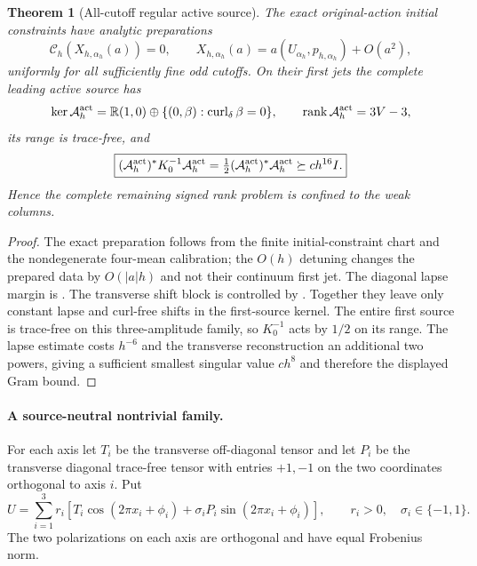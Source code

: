 \documentclass[11pt]{article}
\newtheorem{theorem}{Theorem}[section]
\theoremstyle{definition}
\theoremstyle{remark}
\newcommand{\rank}{\operatorname{rank}}
\begin{document}
\begin{theorem}[All-cutoff regular active source]
\label{thm:supp-exact-active-regular}
The exact original-action initial constraints have analytic preparations
\begin{equation}
 \mathscr C_h(X_{h,\alpha_h}(a))=0,
 \qquad X_{h,\alpha_h}(a)=a(U_{\alpha_h},p_{h,\alpha_h})+O(a^2),
 \label{eq:supp-exact-detuned-preparation}
\end{equation}
uniformly for all sufficiently fine odd cutoffs.  On their first jets the
complete leading active source has
\begin{equation}
 \ker\mathcal A_h^{\rm act}=\mathbb R(1,0)
 \oplus\{(0,\beta):\operatorname{curl}_\delta\beta=0\},
 \qquad \rank\mathcal A_h^{\rm act}=3V-3,
 \label{eq:supp-exact-active-rank}
\end{equation}
its range is trace-free, and
\begin{equation}
 \boxed{(\mathcal A_h^{\rm act})^*K_0^{-1}\mathcal A_h^{\rm act}
 =\tfrac12(\mathcal A_h^{\rm act})^*\mathcal A_h^{\rm act}
 \succeq ch^{16}I.}
 \label{eq:supp-exact-active-Gram}
\end{equation}
Hence the complete remaining signed rank problem is confined to the weak
columns.
\end{theorem}
\begin{proof}
The exact preparation follows from the finite initial-constraint chart and
the nondegenerate four-mean calibration; the $O(h)$ detuning changes the
prepared data by $O(|a|h)$ and not their continuum first jet.  The diagonal
lapse margin is .  The transverse
shift block is controlled by .  Together they
leave only constant lapse and curl-free shifts in the first-source kernel.
The entire first source is trace-free on this three-amplitude family, so
$K_0^{-1}$ acts by $1/2$ on its range.  The lapse estimate costs $h^{-6}$ and
the transverse reconstruction an additional two powers, giving a sufficient
smallest singular value $ch^8$ and therefore the displayed Gram bound.
\end{proof}

\paragraph{A source-neutral nontrivial family.}
For each axis let $T_i$ be the transverse off-diagonal tensor and let $P_i$
be the transverse diagonal trace-free tensor with entries $+1,-1$ on the two
coordinates orthogonal to axis $i$.  Put
\begin{equation}
 U=\sum_{i=1}^3r_i\left[T_i\cos(2\pi x_i+\phi_i)
          +\sigma_iP_i\sin(2\pi x_i+\phi_i)\right],
 \qquad r_i>0,\quad\sigma_i\in\{-1,1\}.
 \label{eq:supp-exact-balanced-family}
\end{equation}
The two polarizations on each axis are orthogonal and have equal Frobenius
norm.
\end{document}
